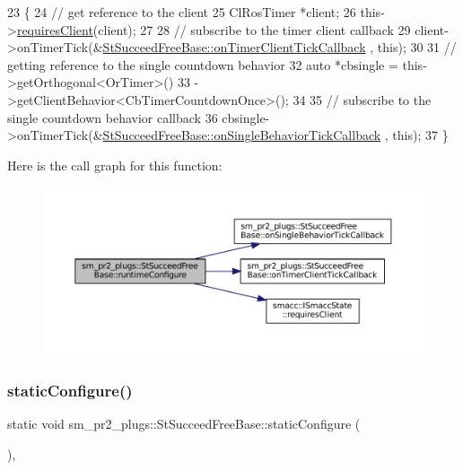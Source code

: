 \begin{DoxyCode}
23     \{
24         \textcolor{comment}{// get reference to the client}
25         ClRosTimer *client;
26         this->\hyperlink{classsmacc_1_1ISmaccState_a7f95c9f0a6ea2d6f18d1aec0519de4ac}{requiresClient}(client);
27 
28         \textcolor{comment}{// subscribe to the timer client callback}
29         client->onTimerTick(&\hyperlink{structsm__pr2__plugs_1_1StSucceedFreeBase_a53328e9b7c378014ba1d19b835808582}{StSucceedFreeBase::onTimerClientTickCallback}
      , \textcolor{keyword}{this});
30 
31         \textcolor{comment}{// getting reference to the single countdown behavior}
32         \textcolor{keyword}{auto} *cbsingle = this->getOrthogonal<OrTimer>()
33                              ->getClientBehavior<CbTimerCountdownOnce>();
34 
35         \textcolor{comment}{// subscribe to the single countdown behavior callback}
36         cbsingle->onTimerTick(&\hyperlink{structsm__pr2__plugs_1_1StSucceedFreeBase_a18e063dd7dc924cd903824eaa2b680f7}{StSucceedFreeBase::onSingleBehaviorTickCallback}
      , \textcolor{keyword}{this});
37     \}
\end{DoxyCode}
Here is the call graph for this function\+:
\nopagebreak
\begin{figure}[H]
\begin{center}
\leavevmode
\includegraphics[width=350pt]{structsm__pr2__plugs_1_1StSucceedFreeBase_a90ef93147b370cf240d7800f1414648d_cgraph}
\end{center}
\end{figure}
\mbox{\label{structsm__pr2__plugs_1_1StSucceedFreeBase_aeae400a9749af1efbe82e16b1b72529b}} 
\subsubsection{\texorpdfstring{static\+Configure()}{staticConfigure()}}
{\footnotesize\ttfamily static void sm\+\_\+pr2\+\_\+plugs\+::\+St\+Succeed\+Free\+Base\+::static\+Configure (\begin{DoxyParamCaption}{ }\end{DoxyParamCaption})\hspace{0.3cm}{\ttfamily [inline]}, {\ttfamily [static]}}



